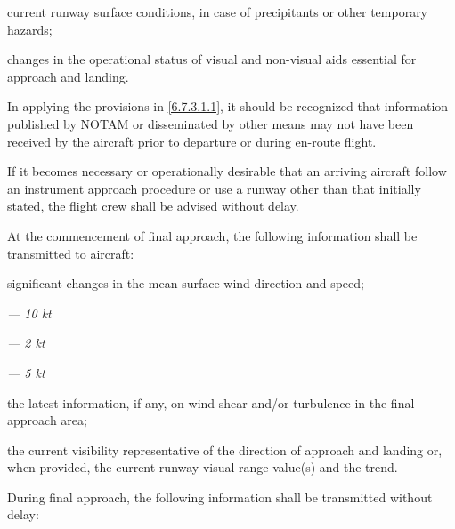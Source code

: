 \begin{enumnoss}
    \begin{enumalph}[resume*]
        \item current runway surface conditions, in case of precipitants or other temporary hazards;
        \item changes in the operational status of visual and non-visual aids essential for approach and landing.
    \end{enumalph}

    \item In applying the provisions in \ref{6.7.3.1.1}, it should be recognized that information published by NOTAM or disseminated by other means may not have been received by the aircraft prior to departure or during en-route flight.
    \item If it becomes necessary or operationally desirable that an arriving aircraft follow an instrument approach procedure or use a runway other than that initially stated, the flight crew shall be advised without delay.
    \item At the commencement of final approach, the following information shall be transmitted to aircraft:

    \begin{enumalph}
        \item significant changes in the mean surface wind direction and speed;


        \noindent \textit{--- \quad {}10 kt}

        \noindent \textit{--- \quad {}2 kt}

        \noindent \textit{--- \quad {}5 kt}

        \item the latest information, if any, on wind shear and/or turbulence in the final approach area;
        \item the current visibility representative of the direction of approach and landing or, when provided, the current runway visual range value(s) and the trend.
    \end{enumalph}

    \item During final approach, the following information shall be transmitted without delay:


\end{enumnoss}
